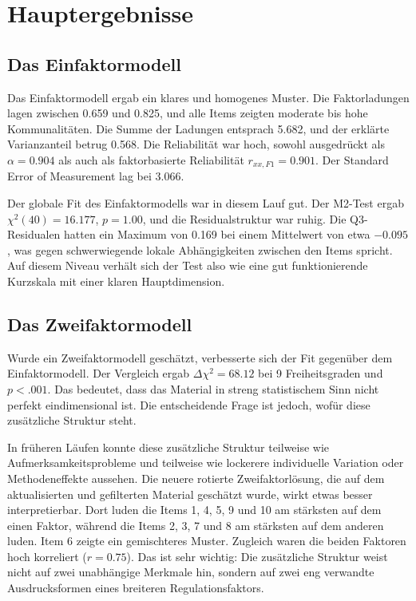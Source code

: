 \documentclass[11pt,a4paper]{article}
\begin{document}
\section{Hauptergebnisse}
\subsection{Das Einfaktormodell}
Das Einfaktormodell ergab ein klares und homogenes Muster. Die Faktorladungen lagen zwischen 0.659 und 0.825, und alle Items zeigten moderate bis hohe Kommunalitäten. Die Summe der Ladungen entsprach 5.682, und der erklärte Varianzanteil betrug 0.568. Die Reliabilität war hoch, sowohl ausgedrückt als $\alpha = 0.904$ als auch als faktorbasierte Reliabilität $r_{xx,F1} = 0.901$. Der Standard Error of Measurement lag bei 3.066.

Der globale Fit des Einfaktormodells war in diesem Lauf gut. Der M2-Test ergab $\chi^2(40)=16.177$, $p=1.00$, und die Residualstruktur war ruhig. Die Q3-Residualen hatten ein Maximum von 0.169 bei einem Mittelwert von etwa $-0.095$, was gegen schwerwiegende lokale Abhängigkeiten zwischen den Items spricht. Auf diesem Niveau verhält sich der Test also wie eine gut funktionierende Kurzskala mit einer klaren Hauptdimension.

\subsection{Das Zweifaktormodell}
Wurde ein Zweifaktormodell geschätzt, verbesserte sich der Fit gegenüber dem Einfaktormodell. Der Vergleich ergab $\Delta \chi^2 = 68.12$ bei 9 Freiheitsgraden und $p < .001$. Das bedeutet, dass das Material in streng statistischem Sinn nicht perfekt eindimensional ist. Die entscheidende Frage ist jedoch, wofür diese zusätzliche Struktur steht.

In früheren Läufen konnte diese zusätzliche Struktur teilweise wie Aufmerksamkeitsprobleme und teilweise wie lockerere individuelle Variation oder Methodeneffekte aussehen. Die neuere rotierte Zweifaktorlösung, die auf dem aktualisierten und gefilterten Material geschätzt wurde, wirkt etwas besser interpretierbar. Dort luden die Items 1, 4, 5, 9 und 10 am stärksten auf dem einen Faktor, während die Items 2, 3, 7 und 8 am stärksten auf dem anderen luden. Item 6 zeigte ein gemischteres Muster. Zugleich waren die beiden Faktoren hoch korreliert ($r = 0.75$). Das ist sehr wichtig: Die zusätzliche Struktur weist nicht auf zwei unabhängige Merkmale hin, sondern auf zwei eng verwandte Ausdrucksformen eines breiteren Regulationsfaktors.
\end{document}
